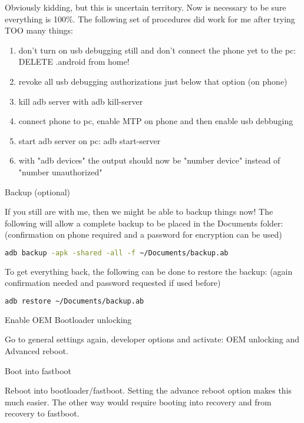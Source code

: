 \par Obviously kidding, but this is uncertain territory. Now is necessary to be sure everything is 100\%. The following set of procedures did work for me after trying TOO many things: 
\begin{enumerate}
    \item don't turn on usb debugging still and don't connect the phone yet to the pc: DELETE .android from home!
    \item revoke all usb debugging authorizations just below that option (on phone)
    \item kill adb server with adb kill-server
    \item connect phone to pc, enable MTP on phone and then enable usb debbuging
    \item start adb server on pc: adb start-server
    \item with "adb devices" the output should now be "number device" instead of "number unauthorized"
\end{enumerate}

\vspace{.5cm}
{\Large {} Backup (optional)}

\par If you still are with me, then we might be able to backup things now! The following will allow a complete backup to be placed in the Documents folder: (confirmation on phone required and a password for encryption can be used)
\begin{lstlisting}[language=bash]
    adb backup -apk -shared -all -f ~/Documents/backup.ab
\end{lstlisting}

\par To get everything back, the following can be done to restore the backup: (again confirmation needed and password requested if used before)

\begin{lstlisting}[language=bash]
    adb restore ~/Documents/backup.ab
\end{lstlisting}


\vspace{.5cm}
{\Large {} Enable OEM Bootloader unlocking}
\par Go to general settings again, developer options and activate: OEM unlocking and Advanced reboot. 


\vspace{.5cm}
{\Large {} Boot into fastboot}
\par Reboot into bootloader/fastboot. Setting the advance reboot option makes this much easier. The other way would require booting into recovery and from recovery to fastboot.

